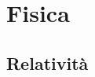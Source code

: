 \documentclass[]{report}
\theoremstyle{definition}
\theoremstyle{remark}
\theoremstyle{plain}
\numberwithin{equation}{chapter}
\begin{document}








\part{Fisica}



\chapter{Relativit\`{a}}
\end{document}
